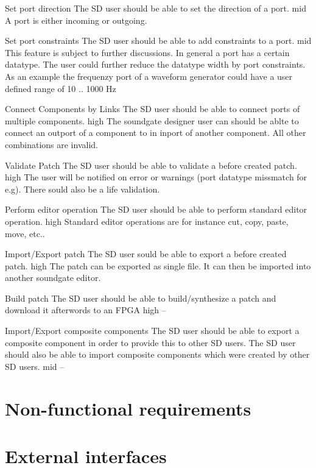 	{Set port direction}
	{The SD user should be able to set the direction of a port.}
	{mid}
	{A port is either incoming or outgoing.}
	
	{Set port constraints}
	{The SD user should be able to add constraints to a port.}
	{mid}
	{This feature is subject to further discussions. In general a port has a certain datatype. The user could further reduce the datatype width by port constraints. As an example the frequenzy port of a waveform generator could have a user defined range of 10 .. 1000 Hz }
	
	{Connect Components by Links}
	{The SD user should be able to connect ports of multiple components.}
	{high}
	{The soundgate designer user can should be ablte to connect an outport of a component to in inport of another component. All other combinations are invalid.}
	
	{Validate Patch}
	{The SD user should be able to validate a before created patch.}
	{high}
	{The user will be notified on error or warnings (port datatype missmatch for e.g). There sould also be a life validation.}
	
	{Perform editor operation}
	{The SD user should be able to perform standard editor operation.}
	{high}
	{Standard editor operations are for instance cut, copy, paste, move, etc..}
	
	{Import/Export patch}
	{The SD user sould be able to export a before created patch.}
	{high}
	{The patch can be exported as single file. It can then be imported into another soundgate editor.}
	
	{Build patch}
	{The SD user should be able to build/synthesize a patch and download it afterwords to an FPGA}
	{high}
	{--}
	
	{Import/Export composite components}
	{The SD user should be able to export a composite component in order to provide this to other SD users. The SD user should also be able to import composite components which were created by other SD users.}
	{mid}
	{--}
	
	\section{Non-functional requirements}
	\section{External interfaces}
